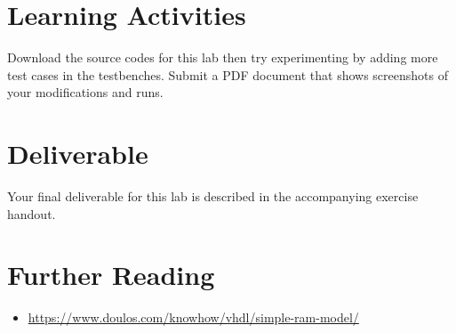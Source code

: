 \documentclass[a4paper, 11pt,oneside]{article}
\begin{document}
\section{Learning Activities}
Download the source codes for this lab then try experimenting by adding more 
test cases in the testbenches. Submit a PDF document that shows screenshots of 
your modifications and runs. 

\section{Deliverable}
Your final deliverable for this lab is described in the accompanying exercise handout.

\section{Further Reading}
\begin{itemize}
\item 
\href{https://www.doulos.com/knowhow/vhdl/simple-ram-model/}
{https://www.doulos.com/knowhow/vhdl/simple-ram-model/}
\end{itemize}





\nocite{*}
\end{document}
